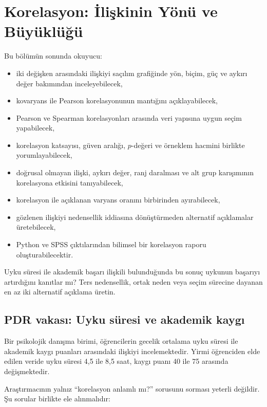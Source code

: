 \chapter{Korelasyon: İlişkinin Yönü ve Büyüklüğü}
\label{ch:correlation-regression}

\begin{hedefler}
Bu bölümün sonunda okuyucu:
\begin{itemize}
  \item iki değişken arasındaki ilişkiyi saçılım grafiğinde yön, biçim, güç ve aykırı değer bakımından inceleyebilecek,
  \item kovaryans ile Pearson korelasyonunun mantığını açıklayabilecek,
  \item Pearson ve Spearman korelasyonları arasında veri yapısına uygun seçim yapabilecek,
  \item korelasyon katsayısı, güven aralığı, $p$-değeri ve örneklem hacmini birlikte yorumlayabilecek,
  \item doğrusal olmayan ilişki, aykırı değer, ranj daralması ve alt grup karışımının korelasyona etkisini tanıyabilecek,
  \item korelasyon ile açıklanan varyans oranını birbirinden ayırabilecek,
  \item gözlenen ilişkiyi nedensellik iddiasına dönüştürmeden alternatif açıklamalar üretebilecek,
  \item Python ve SPSS çıktılarından bilimsel bir korelasyon raporu oluşturabilecektir.
\end{itemize}
\end{hedefler}

\begin{hazirlik}
Uyku süresi ile akademik başarı ilişkili bulunduğunda bu sonuç uykunun başarıyı
artırdığını kanıtlar mı? Ters nedensellik, ortak neden veya seçim sürecine
dayanan en az iki alternatif açıklama üretin.
\end{hazirlik}

\section{PDR vakası: Uyku süresi ve akademik kaygı}

Bir psikolojik danışma birimi, öğrencilerin gecelik ortalama uyku süresi ile
akademik kaygı puanları arasındaki ilişkiyi incelemektedir. Yirmi öğrenciden
elde edilen veride uyku süresi 4,5 ile 8,5 saat, kaygı puanı 40 ile 75 arasında
değişmektedir.

Araştırmacının yalnız ``korelasyon anlamlı mı?'' sorusunu sorması yeterli
değildir. Şu sorular birlikte ele alınmalıdır:

